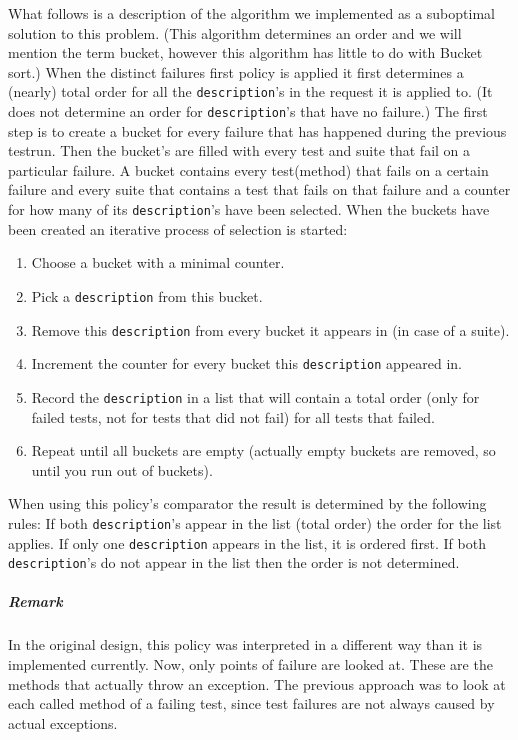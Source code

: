 \documentclass[i2]{oss}
\newcommand{\class}[1]{\texttt{#1}}
\begin{document}
What follows is a description of the algorithm we implemented as a 
suboptimal solution to this problem.
(This algorithm determines an order and we will mention the term bucket,
however this algorithm has little to do with Bucket sort.)
When the distinct failures first policy is applied it first determines a 
(nearly) total order for all the \class{description}'s in the request it 
is applied to.
(It does not determine an order for \class{description}'s that have no
failure.)
The first step is to create a bucket for every failure that has 
happened during the previous testrun.
Then the bucket's are filled with every test and suite that fail on a 
particular failure.
A bucket contains every test(method) that fails on a certain failure 
and every suite that contains a test that fails on that failure and a 
counter for how many of its \class{description}'s have been selected.
When the buckets have been created an iterative process of selection is
started:
\begin{enumerate}
	\item Choose a bucket with a minimal counter.
	\item Pick a \class{description} from this bucket.
	\item Remove this \class{description} from every bucket it appears in
    		(in case of a suite).
	\item Increment the counter for every bucket this \class{description}
    		appeared in.
	\item Record the \class{description} in a list that will contain a 
    		total order (only for failed tests, not for tests that did 
            not fail) for all tests that failed.
	\item Repeat until all buckets are empty (actually empty buckets 
    		are removed, so until you run out of buckets).
\end{enumerate}
            
When using this policy's comparator the result is determined by the 
following rules:
If both \class{description}'s appear in the list (total order) the order 
for the list applies.
If only one \class{description} appears in the list, it is ordered first.
If both \class{description}'s do not appear in the list then the order 
is not determined.

\subparagraph{Remark}

In the original design, this policy was interpreted in a different way than it is implemented currently.
Now, only points of failure are looked at. These are the methods that actually throw an exception. The previous approach was to look at each called method of a failing test, since test failures are not always caused by actual exceptions.
\end{document}
